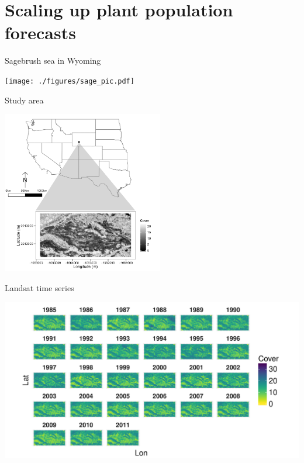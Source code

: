 \documentclass[14pt, compress, aspectratio=1610]{beamer}
\let\OldTexttt\texttt
\renewcommand{\texttt}[1]{\OldTexttt{\color{plTT}#1}}
\begin{document}
\hypertarget{scaling-up-plant-population-forecasts}{%
\section{Scaling up plant population
forecasts}\label{scaling-up-plant-population-forecasts}}

\begin{frame}{%
\protect\hypertarget{sagebrush-sea-in-wyoming}{%
Sagebrush sea in Wyoming}}

\centering

\texttt{[image: ./figures/sage\_pic.pdf]}

\end{frame}

\begin{frame}{%
\protect\hypertarget{study-area}{%
Study area}}

\centering

\includegraphics[height=2.8in]{./figures/studyarea_map.png}

\end{frame}

\begin{frame}{%
\protect\hypertarget{landsat-time-series}{%
Landsat time series}}

\includegraphics[height=2.8in]{./figures/all_years_percCover.pdf}

\end{frame}
\end{document}
